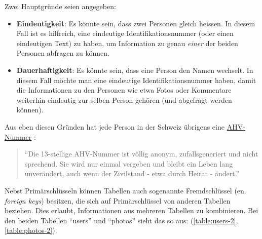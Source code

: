 Zwei Hauptgründe seien angegeben:

\begin{itemize}
\item \textbf{Eindeutigkeit}: Es könnte sein, dass zwei Personen gleich heissen. In diesem Fall ist es hilfreich, eine eindeutige Identifikationsnummer (oder einen eindeutigen Text) zu haben, um Information zu genau \textit{einer} der beiden Personen abfragen zu können.
\item \textbf{Dauerhaftigkeit}: Es könnte sein, dass eine Person den Namen wechselt. In diesem Fall möchte man eine eindeutige Identifikationsnummer haben, damit die Informationen zu den Personen wie etwa Fotos oder Kommentare weiterhin eindeutig zur selben Person gehören (und abgefragt werden können).
\end{itemize}

Aus eben diesen Gründen hat jede Person in der Schweiz übrigens eine \href{https://www.bsv.admin.ch/bsv/de/home/sozialversicherungen/ahv/grundlagen-gesetze/ahv-nummer.html}{AHV-Nummer} : \begin{quote}
  ``Die 13-stellige AHV-Nummer ist völlig anonym, zufallsgeneriert und nicht sprechend. Sie wird nur einmal vergeben und bleibt ein Leben lang unverändert, auch wenn der Zivilstand - etwa durch Heirat - ändert.''
\end{quote}


Nebst Primärschlüsseln können Tabellen auch sogenannte Fremdschlüssel (en. \textit{foreign keys}) besitzen, die sich auf Primärschlüssel von anderen Tabellen beziehen. Dies erlaubt, Informationen aus mehreren Tabellen zu kombinieren. Bei den beiden Tabellen \enquote{users} und \enquote{photos} sieht das so aus: (\cref{table:users-2}, \cref{table:photos-2}).

